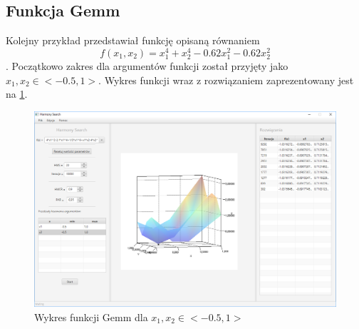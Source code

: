 \documentclass[10pt, a4paper]{article}
\begin{document}
\subsection{Funkcja Gemm}
\label{subsec:gemm}
Kolejny przykład przedstawiał funkcję opisaną równaniem $$f(x_{1},x_{2}) = x_{1}^{4}+x_{2}^{4}-0.62x_{1}^{2}-0.62x_{2}^{2}$$. Początkowo zakres dla argumentów funkcji został przyjęty jako $x_{1},x_{2} \in <-0.5,1>$. Wykres funkcji wraz z rozwiązaniem zaprezentowany jest na \ref{fig:21}. 
\begin{figure}[htbp]
	\centering
	\includegraphics[width=.9\textwidth]{images/21.PNG}
	\caption{Wykres funkcji Gemm dla $x_{1}, x_{2} \in <-0.5,1>$}
	\label{fig:21}
\end{figure}
\end{document}
